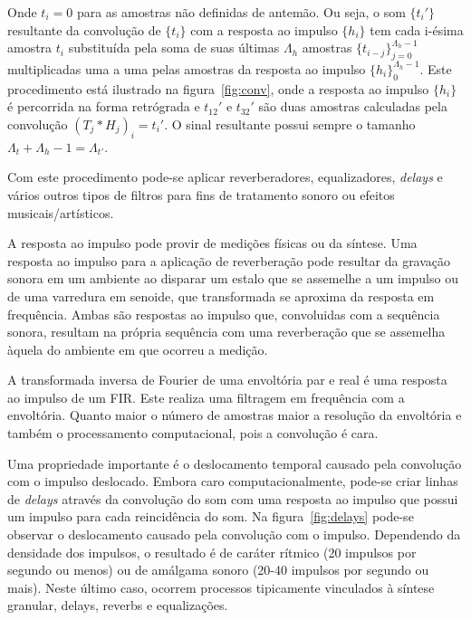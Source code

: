 \begin{itemize}
Onde $t_i=0$ para as
amostras não definidas de antemão.
Ou seja, o som $\{t_i'\}$ resultante da convolução de $\{t_i\}$ com a resposta ao impulso $\{h_i\}$
tem cada i-ésima amostra $t_i$ substituída pela soma de suas últimas $\Lambda_h$ amostras $\{t_{i-j}\}_{j=0}^{\Lambda_h-1}$
multiplicadas uma a uma pelas amostras da resposta ao impulso $\{h_i\}_0^{\Lambda_h-1}$. Este
procedimento está ilustrado na figura~\ref{fig:conv}, onde a resposta ao impulso $\{h_i\}$
é percorrida na forma retrógrada e
$t_{12}'$ e $t_{32}'$ são duas amostras calculadas
pela convolução $(T_j*H_j)_i=t_i'$. O sinal resultante possui
sempre o tamanho $\Lambda_t+\Lambda_h -1=\Lambda_{t'}$.


Com este procedimento pode-se aplicar reverberadores, equalizadores, \emph{delays}
e vários outros tipos de filtros para fins de tratamento sonoro ou
efeitos musicais/artísticos.
 
A resposta ao impulso pode provir de medições
físicas ou da síntese. Uma resposta 
ao impulso para a aplicação
de reverberação pode resultar da gravação sonora em um ambiente ao disparar
um estalo que se assemelhe a um impulso ou 
de uma varredura em senoide, que transformada se aproxima
da resposta em frequência.
Ambas são respostas ao impulso
que, convoluidas com a sequência sonora, resultam na própria sequência
com uma reverberação que se assemelha àquela do ambiente 
em que ocorreu a medição.\cite{Cook}

A transformada inversa
de Fourier de uma envoltória par e real é uma
resposta ao impulso de um FIR. Este realiza
uma filtragem em frequência com a envoltória.
Quanto maior o número de amostras maior
a resolução da envoltória e também 
o processamento computacional, pois a convolução é cara.

Uma propriedade importante é o deslocamento temporal causado pela convolução com o impulso deslocado. Embora caro computacionalmente, 
pode-se criar linhas de \emph{delays} através da convolução do som com uma resposta ao impulso que possui um impulso
para cada reincidência do som.
Na figura~\ref{fig:delays}
pode-se observar o deslocamento causado pela convolução
com o impulso. Dependendo da densidade dos impulsos, o resultado
é de caráter rítmico (20 impulsos por segundo ou menos) ou de amálgama
sonoro (20-40 impulsos por segundo ou mais). Neste último caso,
ocorrem processos tipicamente vinculados à síntese granular, delays, reverbs e equalizações.


\end{itemize}
